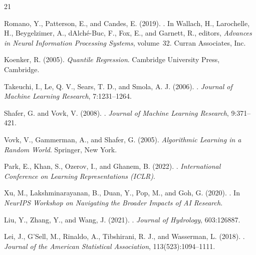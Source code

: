 \documentclass{article}
\begin{document}

\begin{thebibliography}{21}

Romano, Y., Patterson, E., and Candes, E. (2019).
.
\newblock In Wallach, H., Larochelle, H., Beygelzimer, A., d\textquotesingle Alch\'{e}-Buc, F., Fox, E., and Garnett, R., editors, \emph{Advances in Neural Information Processing Systems}, volume~32. Curran Associates, Inc.

Koenker, R. (2005).
\newblock \emph{Quantile Regression}.
\newblock Cambridge University Press, Cambridge.

Takeuchi, I., Le, Q. V., Sears, T. D., and Smola, A. J. (2006).
.
\newblock \emph{Journal of Machine Learning Research}, 7:1231--1264.

Shafer, G. and Vovk, V. (2008).
.
\newblock \emph{Journal of Machine Learning Research}, 9:371--421.

Vovk, V., Gammerman, A., and Shafer, G. (2005).
\newblock \emph{Algorithmic Learning in a Random World}.
\newblock Springer, New York.

Park, E., Khan, S., Ozerov, I., and Ghanem, B. (2022).
.
\newblock \emph{International Conference on Learning Representations (ICLR)}.

Xu, M., Lakshminarayanan, B., Duan, Y., Pop, M., and Goh, G. (2020).
.
\newblock In \emph{NeurIPS Workshop on Navigating the Broader Impacts of AI Research}.

Liu, Y., Zhang, Y., and Wang, J. (2021).
.
\newblock \emph{Journal of Hydrology}, 603:126887.

Lei, J., G'Sell, M., Rinaldo, A., Tibshirani, R. J., and Wasserman, L. (2018).
.
\newblock \emph{Journal of the American Statistical Association}, 113(523):1094--1111.


\end{thebibliography}
\end{document}
